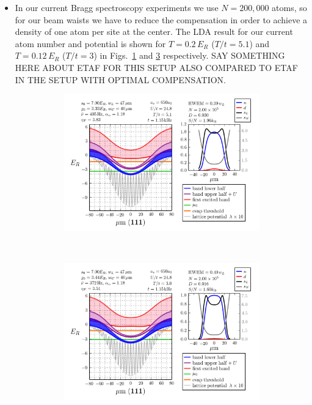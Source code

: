 \documentclass[11pt,letter]{article}
\begin{document}
\begin{itemize}
\item  In our current Bragg spectroscopy experiments we use $N=200,000$ atoms,
so for our beam waists we have to reduce the compensation in order to achieve a
density of one atom per site at the center.    The LDA result for our current
atom number and potential is shown for $T=0.2\,E_{R}$ ($T/t=5.1$) and
$T=0.12\,E_{R}$ ($T/t=3$) in Figs.~\ref{fig:profiles002} and
\ref{fig:profiles003} respectively. SAY SOMETHING HERE ABOUT ETAF FOR THIS SETUP
ALSO COMPARED TO ETAF IN THE SETUP WITH OPTIMAL COMPENSATION.
\begin{figure}[H]
        \centering
        \begin{subfigure}[t]{0.42\textwidth}
		\includegraphics[width=\textwidth]{figures_hubbard-lda/002.png}
\caption{ }
                \label{fig:profiles002}
        \end{subfigure}%
        ~~ %
        \begin{subfigure}[t]{0.42\textwidth}
		\includegraphics[width=\textwidth]{figures_hubbard-lda/003.png}
\caption{ }
                \label{fig:profiles003}
        \end{subfigure}
	\caption{}
\end{figure}


\end{itemize}
\end{document}
